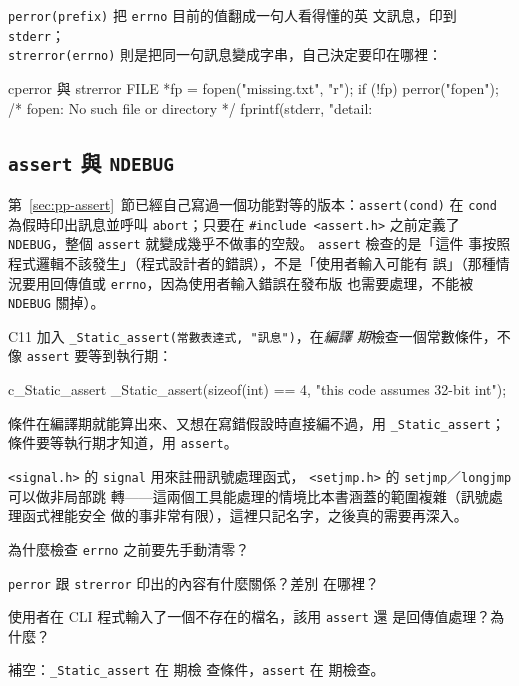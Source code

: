 \texttt{perror(prefix)} 把 \texttt{errno} 目前的值翻成一句人看得懂的英
文訊息，印到 \texttt{stderr}；\\
\texttt{strerror(errno)} 則是把同一句訊息變成字串，自己決定要印在哪裡：

\begin{code}{c}{perror 與 strerror}
FILE *fp = fopen("missing.txt", "r");
if (!fp) {
    perror("fopen");                          /* fopen: No such file or directory */
    fprintf(stderr, "detail: %
}
\end{code}

\subsection{\texttt{assert} 與 \texttt{NDEBUG}}

第~\ref{sec:pp-assert}~節已經自己寫過一個功能對等的版本：\texttt{assert(cond)}
在 \texttt{cond} 為假時印出訊息並呼叫 \texttt{abort}；只要在
\texttt{\#include <assert.h>} 之前定義了 \texttt{NDEBUG}，整個
\texttt{assert} 就變成幾乎不做事的空殼。 \texttt{assert} 檢查的是「這件
事按照程式邏輯不該發生」（程式設計者的錯誤），不是「使用者輸入可能有
誤」（那種情況要用回傳值或 \texttt{errno}，因為使用者輸入錯誤在發布版
也需要處理，不能被 \texttt{NDEBUG} 關掉）。

C11 加入 \texttt{\_Static\_assert(常數表達式, "訊息")}，在\textit{編譯
期}檢查一個常數條件，不像 \texttt{assert} 要等到執行期：

\begin{code}{c}{\_Static\_assert}
_Static_assert(sizeof(int) == 4, "this code assumes 32-bit int");
\end{code}

條件在編譯期就能算出來、又想在寫錯假設時直接編不過，用
\texttt{\_Static\_assert}；條件要等執行期才知道，用 \texttt{assert}。

\texttt{<signal.h>} 的 \texttt{signal} 用來註冊訊號處理函式，
\texttt{<setjmp.h>} 的 \texttt{setjmp}／\texttt{longjmp} 可以做非局部跳
轉——這兩個工具能處理的情境比本書涵蓋的範圍複雜（訊號處理函式裡能安全
做的事非常有限），這裡只記名字，之後真的需要再深入。


\begin{drills}[label=drills:sl-errors]
\item 為什麼檢查 \texttt{errno} 之前要先手動清零？
\item \texttt{perror} 跟 \texttt{strerror} 印出的內容有什麼關係？差別
在哪裡？
\item 使用者在 CLI 程式輸入了一個不存在的檔名，該用 \texttt{assert} 還
是回傳值處理？為什麼？
\item 補空：\texttt{\_Static\_assert} 在 \underline{\hspace{2em}} 期檢
查條件，\texttt{assert} 在 \underline{\hspace{2em}} 期檢查。
\end{drills}

